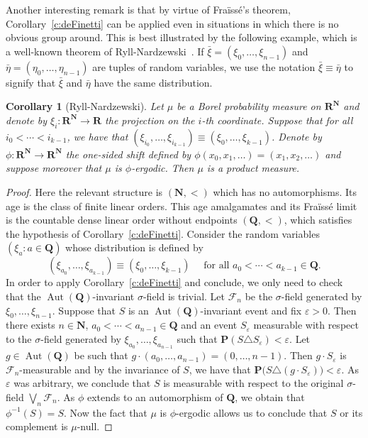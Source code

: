 \documentclass[JEP,XML,SOM,Unicode,published]{cedram}
\let\mathcal\mathscr
\let\eps\varepsilon
\let\sdiff\triangle
\theoremstyle{plain}
\newtheorem{cor}[theorem]{Corollary}
\theoremstyle{definition}
\newcommand{\N}{{\mathbf N}}
\newcommand{\Q}{{\mathbf Q}}
\newcommand{\R}{{\mathbf R}}
\newcommand{\bP}{{\mathbf P}}\let\Pr\bP
\newcommand{\cF}{\mathcal{F}}
\DeclareMathOperator{\Aut}{Aut}
\begin{document}
Another interesting remark is that by virtue of Fraïssé's theorem, Corollary~\ref{c:deFinetti} can be applied even in situations in which there is no obvious group around. This is best illustrated by the following example, which is a well-known theorem of Ryll-Nardzewski~\cite{RyllNardzewski1957}. If $\bar \xi = (\xi_0, \ldots, \xi_{n-1})$ and $\bar \eta = (\eta_0, \ldots, \eta_{n-1})$ are tuples of random variables, we use the notation $\bar \xi \equiv \bar \eta$ to signify that $\bar \xi$ and $\bar \eta$ have the same distribution.
\begin{cor}[Ryll-Nardzewski]
\label{c:RyllNardzewski}
Let $\mu$ be a Borel probability measure on $\R^\N$ and denote by $\xi_i \colon \R^\N \to \R$ the projection on the $i$-th coordinate. Suppose that for all $i_0 < \cdots < i_{k-1}$, we have that $(\xi_{i_0}, \ldots, \xi_{i_{k-1}}) \equiv (\xi_0, \ldots, \xi_{k-1})$. Denote by $\phi \colon \R^\N \to \R^\N$ the one-sided shift defined by $\phi(x_0, x_1, \ldots) = (x_1, x_2, \ldots)$ and suppose moreover that $\mu$ is $\phi$-ergodic. Then $\mu$ is a product measure.
\end{cor}
\begin{proof}
Here the relevant structure is $(\N, <)$ which has no automorphisms. Its age is the class of finite linear orders. This age amalgamates and its Fraïssé limit is the countable dense linear order without endpoints $(\Q, <)$, which satisfies the hypothesis of Corollary~\ref{c:deFinetti}. Consider the random variables $(\xi_a : a \in \Q)$ whose distribution is defined by
\begin{equation*}
(\xi_{a_0}, \ldots, \xi_{a_{k-1}}) \equiv (\xi_0, \ldots, \xi_{k-1}) \quad \text{ for all } a_0 < \cdots < a_{k-1} \in \Q.
\end{equation*}
In order to apply Corollary~\ref{c:deFinetti} and conclude, we only need to check that the $\Aut(\Q)$-invariant $\sigma$-field is trivial. Let $\cF_n$ be the $\sigma$-field generated by $\xi_0, \ldots, \xi_{n-1}$. Suppose that $S$ is an $\Aut(\Q)$-invariant event and fix $\eps > 0$. Then there exists $n \in \N$, $a_0 < \cdots < a_{n-1} \in \Q$ and an event $S_\eps$ measurable with respect to the $\sigma$-field generated by $\xi_{a_0}, \ldots, \xi_{a_{n-1}}$ such that $\bP(S \sdiff S_\eps) < \eps$. Let $g \in \Aut(\Q)$ be such that $g \cdot (a_0, \ldots, a_{n-1}) = (0, \ldots, n-1)$. Then $g \cdot S_\eps$ is $\cF_n$-measurable and by the invariance of $S$, we have that $\bP \big(S \sdiff (g \cdot S_\eps) \big) < \eps$. As $\eps$ was arbitrary, we conclude that $S$ is measurable with respect to the original $\sigma$-field $\bigvee_n \cF_n$. As $\phi$ extends to an automorphism of $\Q$, we obtain that $\phi^{-1}(S) = S$. Now the fact that $\mu$ is $\phi$-ergodic allows us to conclude that $S$ or its complement is $\mu$-null.
\end{proof}
\end{document}
